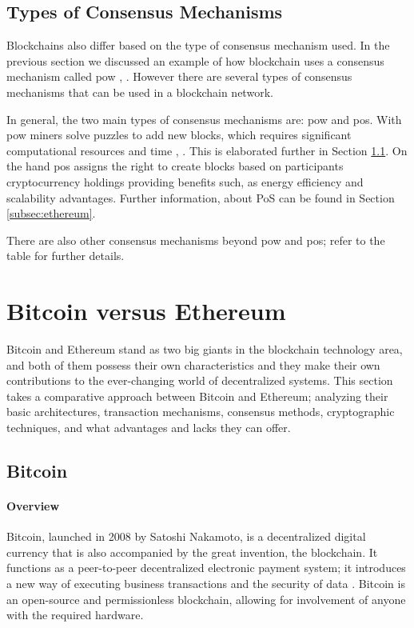 \subsection{Types of Consensus Mechanisms}

Blockchains also differ based on the type of consensus mechanism used. In the previous section we discussed an example of how blockchain uses a consensus mechanism called 
\gls{pow} \cite{9752154}, \cite{10037907}. However there are several types of consensus mechanisms that can be used in a blockchain network. 

In general, the two main types of consensus mechanisms are: \gls{pow} and \gls{pos}. With \gls{pow} miners solve puzzles to add new blocks, which requires significant 
computational resources and time \cite{9752154}, \cite{10037907}. This is elaborated further in Section \ref{subsec:bitcoin}. On the hand \gls{pos} assigns the right 
to create blocks based on participants cryptocurrency holdings providing benefits such, as energy efficiency and scalability advantages. Further information,
about PoS can be found in Section \ref{subsec:ethereum}.

There are also other consensus mechanisms beyond \gls{pow} and \gls{pos}; refer to the table for further details.

\section{Bitcoin versus Ethereum}

Bitcoin and Ethereum stand as two big giants in the blockchain technology area, and both of them possess their own characteristics and they make their own contributions to the ever-changing world of decentralized systems.
This section takes a comparative approach between Bitcoin and Ethereum; analyzing their basic architectures, transaction mechanisms, consensus methods, cryptographic techniques, and what advantages and lacks they can offer.

\subsection{Bitcoin} \label{subsec:bitcoin}

\paragraph{Overview}

Bitcoin, launched in 2008 by Satoshi Nakamoto, is a decentralized digital currency that is also accompanied by the great invention, the blockchain. It functions as a 
peer-to-peer decentralized electronic payment system; it introduces a new way of executing business transactions and the security of data \cite{9129332}. Bitcoin is an open-source 
and permissionless blockchain, allowing for involvement of anyone with the required hardware.

